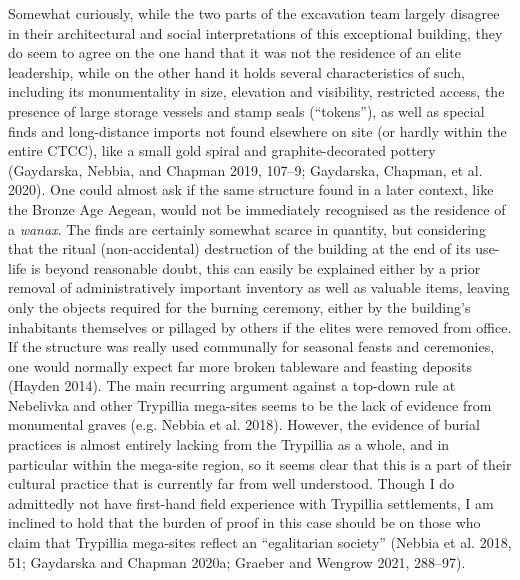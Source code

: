 \documentclass[
  12pt,
  a4paper, twoside]{book}
\begin{document}
Somewhat curiously, while the two parts of the excavation team largely disagree in their architectural and social interpretations of this exceptional building, they do seem to agree on the one hand that it was not the residence of an elite leadership, while on the other hand it holds several characteristics of such, including its monumentality in size, elevation and visibility, restricted access, the presence of large storage vessels and stamp seals (``tokens''), as well as special finds and long-distance imports not found elsewhere on site (or hardly within the entire CTCC), like a small gold spiral and graphite-decorated pottery (Gaydarska, Nebbia, and Chapman 2019, 107--9; Gaydarska, Chapman, et al. 2020). One could almost ask if the same structure found in a later context, like the Bronze Age Aegean, would not be immediately recognised as the residence of a \emph{wanax}. The finds are certainly somewhat scarce in quantity, but considering that the ritual (non-accidental) destruction of the building at the end of its use-life is beyond reasonable doubt, this can easily be explained either by a prior removal of administratively important inventory as well as valuable items, leaving only the objects required for the burning ceremony, either by the building's inhabitants themselves or pillaged by others if the elites were removed from office. If the structure was really used communally for seasonal feasts and ceremonies, one would normally expect far more broken tableware and feasting deposits (Hayden 2014). The main recurring argument against a top-down rule at Nebelivka and other Trypillia mega-sites seems to be the lack of evidence from monumental graves (e.g. Nebbia et al. 2018). However, the evidence of burial practices is almost entirely lacking from the Trypillia as a whole, and in particular within the mega-site region, so it seems clear that this is a part of their cultural practice that is currently far from well understood. Though I do admittedly not have first-hand field experience with Trypillia settlements, I am inclined to hold that the burden of proof in this case should be on those who claim that Trypillia mega-sites reflect an ``egalitarian society'' (Nebbia et al. 2018, 51; Gaydarska and Chapman 2020a; Graeber and Wengrow 2021, 288--97).
\end{document}
